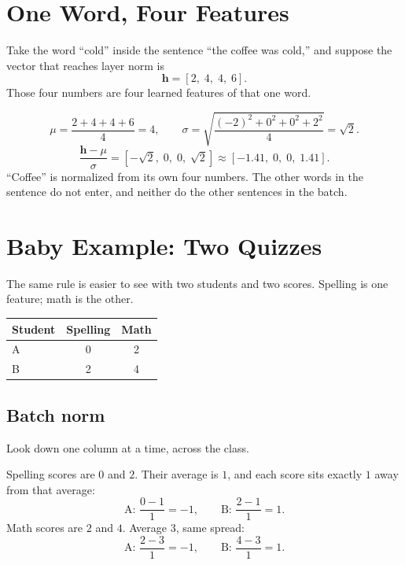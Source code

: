 \documentclass[11pt]{article}
\begin{document}
\section{One Word, Four Features}

Take the word ``cold'' inside the sentence ``the coffee was cold,'' and
suppose the vector that reaches layer norm is
\[
  \mathbf{h} = [2,\; 4,\; 4,\; 6].
\]
Those four numbers are four learned features of that one word.

\[
  \mu = \frac{2+4+4+6}{4} = 4,
  \qquad
  \sigma
  =
  \sqrt{\frac{(-2)^2+0^2+0^2+2^2}{4}}
  =
  \sqrt{2}.
\]
\[
  \frac{\mathbf{h}-\mu}{\sigma}
  =
  [-\sqrt{2},\; 0,\; 0,\; \sqrt{2}]
  \approx
  [-1.41,\; 0,\; 0,\; 1.41].
\]
``Coffee'' is normalized from its own four numbers. The other words in the
sentence do not enter, and neither do the other sentences in the batch.

\section{Baby Example: Two Quizzes}

The same rule is easier to see with two students and two scores. Spelling
is one feature; math is the other.

\begin{center}
\begin{tabular}{@{}lcc@{}}
\toprule
Student & Spelling & Math \\
\midrule
A & 0 & 2 \\
B & 2 & 4 \\
\bottomrule
\end{tabular}
\end{center}

\subsection{Batch norm}

Look down one column at a time, across the class.

Spelling scores are \(0\) and \(2\). Their average is \(1\), and each score
sits exactly \(1\) away from that average:
\[
  \text{A: }\frac{0-1}{1} = -1,
  \qquad
  \text{B: }\frac{2-1}{1} = 1.
\]
Math scores are \(2\) and \(4\). Average \(3\), same spread:
\[
  \text{A: }\frac{2-3}{1} = -1,
  \qquad
  \text{B: }\frac{4-3}{1} = 1.
\]
\end{document}
